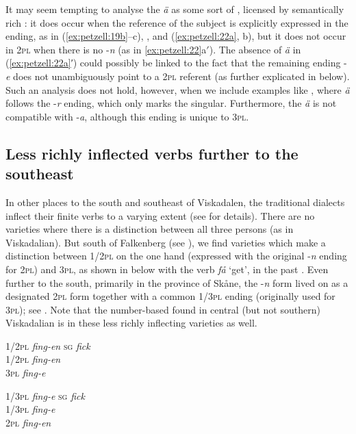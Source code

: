 \documentclass[output=paper,colorlinks,citecolor=brown,draft,draftmode]{langscibook}
\begin{document}
It may seem tempting to analyse the \textit{ä} as some sort of , licensed by semantically rich : it does occur when the reference of the subject is explicitly expressed in the ending, as in (\ref{ex:petzell:19b}–c), , and (\ref{ex:petzell:22a}, b), but it does not occur in 2\textsc{pl} when there is no -\textit{n} (as in \ref{ex:petzell:22}a$'$). The absence of \textit{ä} in (\ref{ex:petzell:22a}′) could possibly be linked to the fact that the remaining ending -\textit{e} does not unambiguously point to a 2\textsc{pl} referent (as further explicated in  below). Such an analysis does not hold, however, when we include examples like , where \textit{ä} follows the -\textit{r} ending, which only marks the singular. Furthermore, the \textit{ä} is not compatible with -\textit{a}, although this ending is unique to 3\textsc{pl}.


\subsection{Less richly inflected verbs further to the southeast}\label{sec:petzell:3.2}


In other places to the south and southeast of Viskadalen, the traditional dialects inflect their finite verbs to a varying extent (see \citealt{Horn2015,Horn2017} for details). There are no varieties where there is a distinction between all three persons (as in Viskadalian). But south of Falkenberg (see ), we find varieties which make a distinction between 1/2\textsc{pl} on the one hand (expressed with the original -\textit{n} ending for 2\textsc{pl}) and 3\textsc{pl}, as shown in  below with the verb \textit{få} ‘get’, in the past . Even further to the south, primarily in the province of Skåne, the -\textit{n} form lived on as a designated 2\textsc{pl} form together with a common 1/3\textsc{pl} ending (originally used for 3\textsc{pl}); see . Note that the number-based  found in central (but not southern) Viskadalian is  in these less richly inflecting varieties as well.

\ea\label{ex:petzell:23}
\begin{multicols}{2}
\ea \label{ex:petzell:23a}\begin{tabbing}
    1/2\textsc{pl}  \=   \textit{fing-en}  \kill
    \textsc{sg}     \> \textit{fick}\\                          
    1/2\textsc{pl}  \>  \textit{fing-en}\\
    3\textsc{pl}    \>    \textit{fing-e}
    \end{tabbing}
\ex \label{ex:petzell:23b}\begin{tabbing}
   1/3\textsc{pl} \= \textit{fing-e}\kill
   \textsc{sg}    \> \textit{fick}\\
   1/3\textsc{pl} \> \textit{fing-e}\\
   2\textsc{pl}   \> \textit{fing-en}
   \end{tabbing}
\z
\end{multicols}
\z
\end{document}

